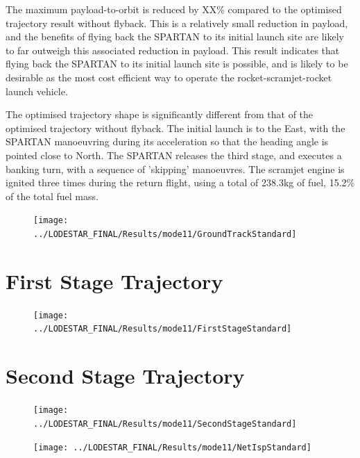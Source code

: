 The maximum payload-to-orbit is reduced by XX\% compared to the optimised trajectory result without flyback. This is a relatively small reduction in payload, and the benefits of flying back the SPARTAN to its initial launch site are likely to far outweigh this associated reduction in payload. This result indicates that flying back the SPARTAN to its initial launch site is possible, and is likely to be desirable as the most cost efficient way to operate the rocket-scramjet-rocket launch vehicle. 

The optimised trajectory shape is significantly different from that of the optimised trajectory without flyback. The initial launch is to the East, with the SPARTAN manoeuvring during its acceleration so that the heading angle is pointed close to North. The SPARTAN releases the third stage, and executes a banking turn, with a sequence of 'skipping' manoeuvres. The scramjet engine is ignited three times during the return flight, using a total of 238.3kg of fuel, 15.2\% of the total fuel mass.

\begin{figure}[ht]
	\centering
	\texttt{[image: ../LODESTAR\_FINAL/Results/mode11/GroundTrackStandard]}
	\caption{}
	\label{fig:GroundTrackStandard}
\end{figure}

\section{First Stage Trajectory}
\begin{figure}[ht]
\centering
\texttt{[image: ../LODESTAR\_FINAL/Results/mode11/FirstStageStandard]}
\caption{}
\label{fig:FirstStageStandard}
\end{figure}

\section{Second Stage Trajectory}
\begin{figure}[ht]
\centering
\texttt{[image: ../LODESTAR\_FINAL/Results/mode11/SecondStageStandard]}
\caption{}
\label{fig:SecondStageStandard}
\end{figure}

\begin{figure}[ht]
\centering
\texttt{[image: ../LODESTAR\_FINAL/Results/mode11/NetIspStandard]}
\caption{}
\label{fig:NetIspStandard}
\end{figure}



